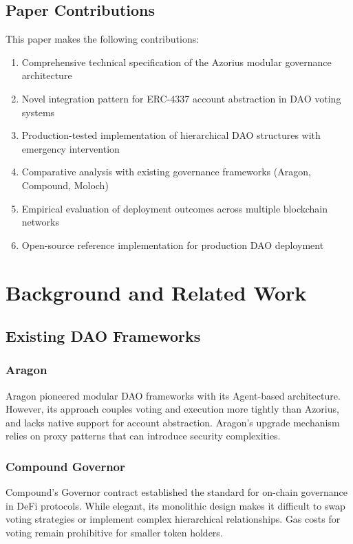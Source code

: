 \documentclass[11pt,a4paper]{article}
\begin{document}
\subsection{Paper Contributions}

This paper makes the following contributions:

\begin{enumerate}
    \item Comprehensive technical specification of the Azorius modular governance architecture
    \item Novel integration pattern for ERC-4337 account abstraction in DAO voting systems
    \item Production-tested implementation of hierarchical DAO structures with emergency intervention
    \item Comparative analysis with existing governance frameworks (Aragon, Compound, Moloch)
    \item Empirical evaluation of deployment outcomes across multiple blockchain networks
    \item Open-source reference implementation for production DAO deployment
\end{enumerate}

\section{Background and Related Work}

\subsection{Existing DAO Frameworks}

\subsubsection{Aragon}

Aragon \cite{aragon} pioneered modular DAO frameworks with its Agent-based architecture. However, its approach couples voting and execution more tightly than Azorius, and lacks native support for account abstraction. Aragon's upgrade mechanism relies on proxy patterns that can introduce security complexities.

\subsubsection{Compound Governor}

Compound's Governor contract \cite{compound} established the standard for on-chain governance in DeFi protocols. While elegant, its monolithic design makes it difficult to swap voting strategies or implement complex hierarchical relationships. Gas costs for voting remain prohibitive for smaller token holders.
\end{document}
